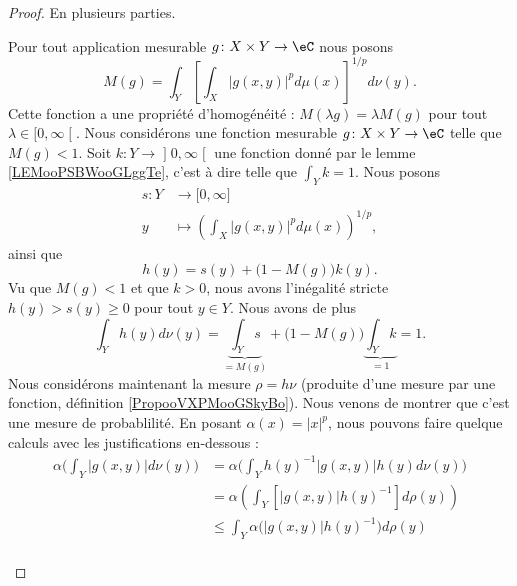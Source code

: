 \begin{proof}
	En plusieurs parties.
	\begin{subproof}
		\spitem[La fonction \( M\)]
		Pour tout application mesurable \( g\colon X\times Y\to \eC\) nous posons
		\begin{equation}
			M(g)=\int_Y \left[ \int_X| g(x,y) |^pd\mu(x) \right]^{1/p}d\nu(y).
		\end{equation}
		Cette fonction a une propriété d'homogénéité : \( M(\lambda g)=\lambda M(g)\) pour tout \( \lambda\in \mathopen[ 0 , \infty \mathclose[\).
			\spitem[Si \(  M(g)<1 \)]
			Nous considérons une fonction mesurable \( g\colon X\times Y\to \eC\) telle que \( M(g)<1\). Soit \( k\colon Y\to \mathopen] 0 , \infty \mathclose[\) une fonction donné par le lemme \ref{LEMooPSBWooGLggTe}, c'est à dire telle que \( \int_Yk=1\). Nous posons
		\begin{equation}
			\begin{aligned}
				s\colon Y & \to \mathopen[ 0 , \infty \mathclose]                   \\
				y         & \mapsto \left( \int_X| g(x,y) |^pd\mu(x) \right)^{1/p},
			\end{aligned}
		\end{equation}
		ainsi que
		\begin{equation}
			h(y)=s(y)+\big(1-M(g)\big)k(y).
		\end{equation}
		Vu que \( M(g)<1\) et que \( k>0\), nous avons l'inégalité stricte \( h(y)>s(y)\geq 0\) pour tout \( y\in Y\). Nous avons de plus
		\begin{equation}
			\int_Y h(y)d\nu(y)=\underbrace{\int_Ys}_{=M(g)}+\big( 1-M(g) \big)\underbrace{\int_Yk}_{=1}=1.
		\end{equation}
		Nous considérons maintenant la mesure \( \rho=h\nu\) (produite d'une mesure par une fonction, définition \ref{PropooVXPMooGSkyBo}). Nous venons de montrer que c'est une mesure de probablilité. En posant \( \alpha(x)=| x |^p\), nous pouvons faire quelque calculs avec les justifications en-dessous :
		\begin{subequations}        \label{SUBEQSooPPZIooSEDcpS}
			\begin{align}
				\alpha\big( \int_Y|g(x,y)|d\nu(y)\big) & =\alpha\big( \int_Yh(y)^{-1}|g(x,y)|h(y)d\nu(y)\big)                                     \\
				                                       & =\alpha\left( \int_Y [|g(x,y)|h(y)^{-1}]d\rho(y) \right)                                 \\
				                                       & \leq \int_Y\alpha\big( |g(x,y)|h(y)^{-1} \big)d\rho(y)       \label{SUBEQooDAWRooOOfQBE} \\

\end{align}
\end{subequations}
\end{subproof}
\end{proof}

